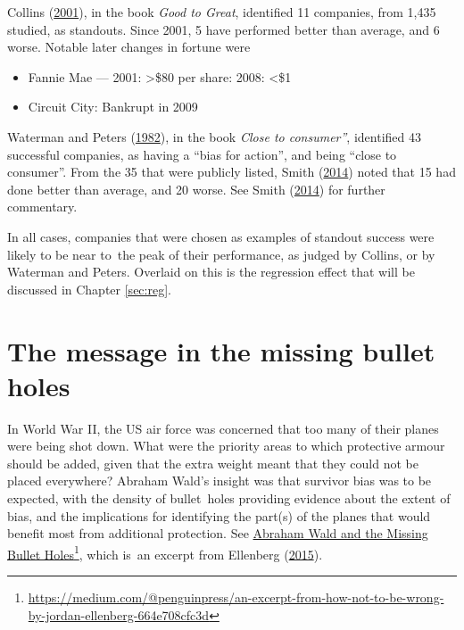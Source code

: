 \documentclass[
  10pt,
  b5paper]{book}
\providecommand{\tightlist}{%
  \setlength{\itemsep}{0pt}\setlength{\parskip}{0pt}}
\begin{document}
Collins (\protect\hyperlink{ref-collins_2001}{2001}), in the book \emph{Good to Great}, identified
11 companies, from 1,435 studied, as standouts. Since 2001,
5 have performed better than average, and 6 worse.
Notable later changes in fortune were

\begin{itemize}
\tightlist
\item
  Fannie Mae --- 2001: \textgreater\$80 per share: 2008: \textless\$1
\item
  Circuit City: Bankrupt in 2009
\end{itemize}

Waterman and Peters (\protect\hyperlink{ref-waterman1982search}{1982}), in the book \emph{Close to consumer''},
identified 43 successful companies, as having a ``bias for action'',
and being ``close to consumer''. From the 35 that were publicly listed,
Smith (\protect\hyperlink{ref-smith-sd}{2014}) noted that 15 had done better than average, and 20 worse.
See Smith (\protect\hyperlink{ref-smith-sd}{2014}) for further commentary.

In all cases, companies that were chosen as examples of
standout success were likely to be near to~the peak of
their performance, as judged by Collins, or by Waterman and Peters.
Overlaid on this is the regression effect that will be discussed
in Chapter \ref{sec:reg}.

\hypertarget{ss:wald}{%
\section{The message in the missing bullet holes}\label{ss:wald}}

In World War II, the US air force was concerned that too many
of their planes were being shot down. What were the priority
areas to which protective armour should be added, given that
the extra weight meant that they could not be placed everywhere?
Abraham Wald's insight was that survivor bias was to be
expected, with the density of bullet~holes providing evidence
about the extent of bias, and the implications for identifying
the part(s) of the planes that would benefit most from
additional protection. See \href{https://medium.com/@penguinpress/an-excerpt-from-how-not-to-be-wrong-by-jordan-ellenberg-664e708cfc3d}{Abraham Wald and the Missing Bullet Holes}\footnote{\url{https://medium.com/@penguinpress/an-excerpt-from-how-not-to-be-wrong-by-jordan-ellenberg-664e708cfc3d}},
which is~an excerpt from Ellenberg (\protect\hyperlink{ref-ellenberg_2015}{2015}).
\end{document}
